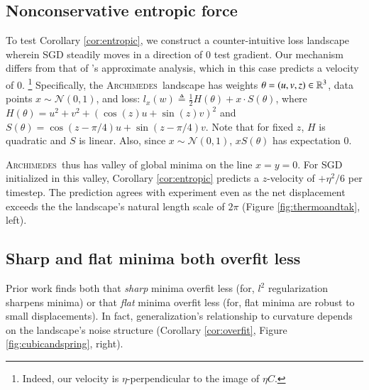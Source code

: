 \documentclass{article}
\theoremstyle{plain}
\theoremstyle{definition}
\newcommand{\Nn}{\mathcal{N}}   \newcommand{\NN}{\mathbb{N}}
\newcommand{\Archimedes}{\textsc{Archimedes}}
\begin{document}

    \subsection{Nonconservative entropic force} \label{subsect:entropic}
        To test Corollary \ref{cor:entropic}, we construct a counter-intuitive
        loss landscape wherein SGD steadily moves in a direction of $0$ test
        gradient.  Our mechanism differs from that of \cite{ch18}'s approximate
        analysis, which in this case predicts a velocity of $0$.%
        \footnote{
            Indeed, our velocity is $\eta$-perpendicular to the image of $\eta
            C$.
        }
        Specifically, the \Archimedes\ landscape has
        weights     $\theta = (u,v,z) \in \mathbb{R}^3$,
        data points $x \sim \Nn(0, 1)$,
        and loss:
        $
            l_x(w)
            \triangleq
            \frac{1}{2} H(\theta) + x \cdot S(\theta)
        $,
        where $H(\theta) = u^2 + v^2 + (\cos(z) u + \sin(z) v)^2$
        and   $S(\theta) = \cos(z-\pi/4) u + \sin(z-\pi/4) v$.
        Note that for fixed $z$, $H$ is quadratic and $S$ is linear.  Also,
        since $x \sim \Nn(0,1)$, $x S(\theta)$ has expectation $0$.

        \Archimedes\ thus has valley of global minima on the line $x=y=0$. 
        For SGD initialized in this valley, Corollary \ref{cor:entropic}
        predicts a $z$-velocity of $+\eta^2/6$ per timestep.  The prediction
        agrees with experiment even as the net displacement exceeds the 
        the landscape's natural length scale of $2\pi$ (Figure \ref{fig:thermoandtak}, left).


    \subsection{Sharp and flat minima both overfit less} \label{subsect:overfit}

        Prior work finds both that \emph{sharp} minima overfit less (for, $l^2$
        regularization sharpens minima) or that \emph{flat} minima overfit less
        (for, flat minima are robust to small displacements).  In fact,
        generalization's relationship to curvature depends on the landscape's
        noise structure (Corollary \ref{cor:overfit}, Figure
        \ref{fig:cubicandspring}, right).
        
\end{document}
